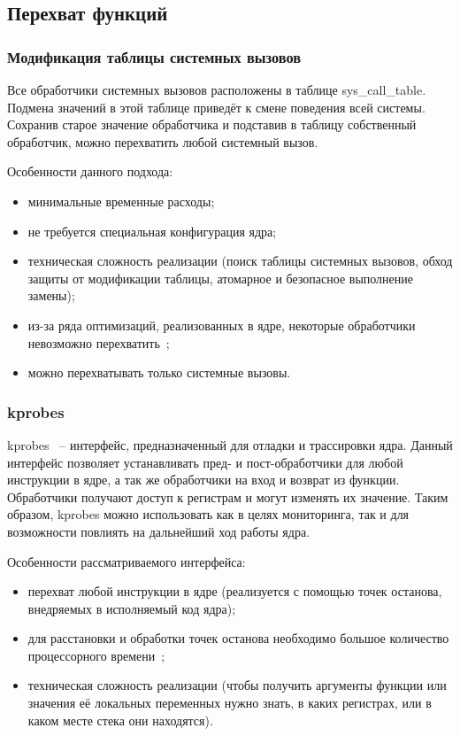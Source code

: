 \newpage

\subsection{Перехват функций}

\subsubsection{Модификация таблицы системных вызовов}

Все обработчики системных вызовов расположены в таблице sys\_call\_table. Подмена значений в этой таблице приведёт к смене поведения всей системы. Сохранив старое значение обработчика и подставив в таблицу собственный обработчик, можно перехватить любой системный вызов.

Особенности данного подхода:

\begin{itemize}
	\item минимальные временные расходы;
	\item не требуется специальная конфигурация ядра;
	\item техническая сложность реализации (поиск таблицы системных вызовов, обход защиты от модификации таблицы, атомарное и безопасное выполнение замены);
	\item из-за ряда оптимизаций, реализованных в ядре, некоторые обработчики невозможно перехватить~\cite{habr-profiling-linux};
	\item можно перехватывать только системные вызовы.
\end{itemize}

\subsubsection{kprobes}

kprobes~\cite{kprobes} -- интерфейс, предназначенный для отладки и трассировки ядра. Данный интерфейс позволяет устанавливать пред- и пост-обработчики для любой инструкции в ядре, а так же обработчики на вход и возврат из функции. Обработчики получают доступ к регистрам и могут изменять их значение. Таким образом, kprobes можно использовать как в целях мониторинга, так и для возможности повлиять на дальнейший ход работы ядра.

Особенности рассматриваемого интерфейса:

\begin{itemize}
	\item перехват любой инструкции в ядре (реализуется с помощью точек останова, внедряемых в исполняемый код ядра);
	\item для расстановки и обработки точек останова необходимо большое количество процессорного времени~\cite{habr-profiling-linux};
	\item техническая сложность реализации (чтобы получить аргументы функции или значения её локальных переменных нужно знать, в каких регистрах, или в каком месте стека они находятся).
\end{itemize}

